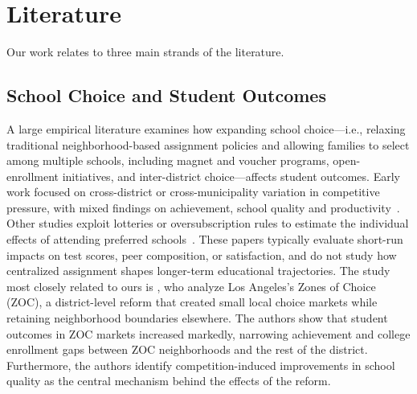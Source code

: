 \section{Literature}\label{sec:literature}
Our work relates to three main strands of the literature.

\subsection{School Choice and Student Outcomes}
A large empirical literature examines how expanding school choice---i.e., relaxing traditional neighborhood-based assignment policies and allowing families to select among multiple schools, including magnet and voucher programs, open-enrollment initiatives, and inter-district choice---affects student outcomes. Early work focused on cross-district or cross-municipality variation in competitive pressure, with mixed findings on achievement, school quality and productivity~\citep{hoxby2000, hoxby2003, hsieh2006, rothstein2007}. Other studies exploit lotteries or oversubscription rules to estimate the individual effects of attending preferred schools~\citep{cullen2006, abdulkadiroglu2011, deming2014, muralidharan2015}. These papers typically evaluate short-run impacts on test scores, peer composition, or satisfaction, and do not study how centralized assignment shapes longer-term educational trajectories.
The study most closely related to ours is \citet{camposkearns2024}, who analyze Los Angeles’s Zones of Choice (ZOC), a district-level reform that created small local choice markets while retaining neighborhood boundaries elsewhere. The authors show that student outcomes in ZOC markets increased markedly, narrowing achievement and college enrollment gaps between ZOC neighborhoods and the rest of the district. Furthermore, the authors identify competition-induced improvements in school quality as the central mechanism behind the effects of the reform. 





